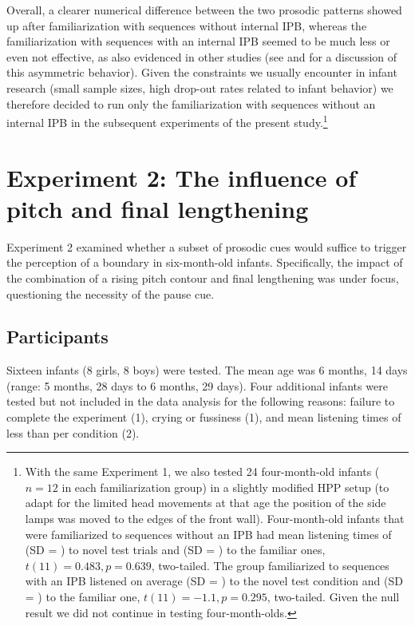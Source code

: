 \documentclass[output=paper]{langscibook}
\begin{document}
\begin{sloppypar}
Overall, a clearer numerical difference between the two prosodic patterns showed up after familiarization with sequences without internal IPB, whereas the familiarization with sequences with an internal IPB seemed to be much less or even not effective, as also evidenced in other studies (see \citealt{VanOmmen2020} and \citealt{Wellmann2012} for a discussion of this asymmetric behavior). Given the constraints we usually encounter in infant research (small sample sizes, high drop-out rates related to infant behavior) we therefore decided to run only the familiarization with sequences without an internal IPB in the subsequent experiments of the present study.\footnote{With the same Experiment 1, we also tested 24 four-month-old infants ($n=12$ in each familiarization group) in a slightly modified HPP setup (to adapt for the limited head movements at that age the position of the side lamps was moved to the edges of the front wall). Four-month-old infants that were familiarized to sequences without an IPB had mean listening times of  (SD = ) to novel test trials and  (SD = ) to the familiar ones, $t(11) = 0.483,\allowbreak p = 0.639$, two-tailed. The group familiarized to sequences with an IPB listened on average  (SD = ) to the novel test condition and  (SD = ) to the familiar one, $t(11) = -1.1, p = 0.295$, two-tailed. Given the null result we did not continue in testing four-month-olds.}
\end{sloppypar}

\section{Experiment 2: The influence of pitch and final lengthening}\largerpage[2]
Experiment 2 examined whether a subset of prosodic cues would suffice to trigger the perception of a boundary in six-month-old infants. Specifically, the impact of the combination of a rising pitch contour and final lengthening was under focus, questioning the necessity of the pause cue.



\subsection{Participants}
Sixteen infants (8 girls, 8 boys) were tested. The mean age was 6 months, 14 days (range: 5 months, 28 days to 6 months, 29 days). Four additional infants were tested but not included in the data analysis for the following reasons: failure to complete the experiment (1), crying or fussiness (1), and mean listening times of less than  per condition (2).
\end{document}
